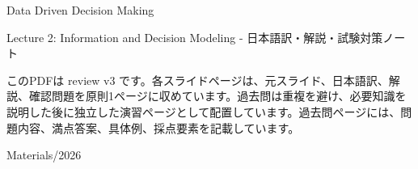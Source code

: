 \documentclass[a4paper,10pt]{article}
\begin{document}
\begin{titlepage}
\centering
\vspace*{2cm}
{\Huge Data Driven Decision Making\par}
\vspace{0.5cm}
{\Large Lecture 2: Information and Decision Modeling - 日本語訳・解説・試験対策ノート\par}
\vspace{1cm}
\begin{minipage}{0.88\textwidth}
このPDFは review v3 です。各スライドページは、元スライド、日本語訳、解説、確認問題を原則1ページに収めています。過去問は重複を避け、必要知識を説明した後に独立した演習ページとして配置しています。過去問ページには、問題内容、満点答案、具体例、採点要素を記載しています。
\end{minipage}
\vfill
{\large Materials/2026}
\end{titlepage}
\tableofcontents
\clearpage

\end{document}
